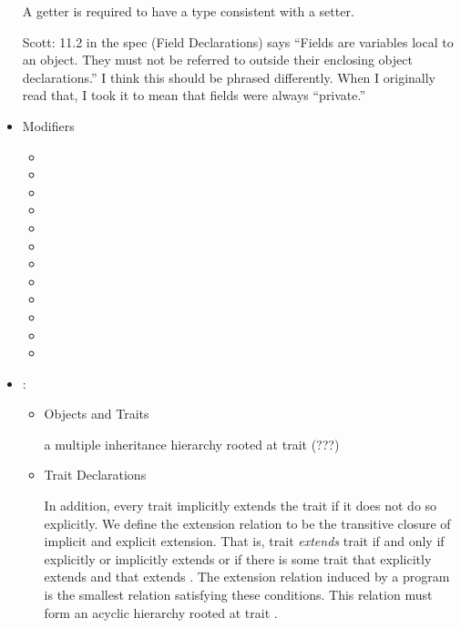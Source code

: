 \begin{itemize}
 A getter is required to have a type consistent with a setter.

Scott: 11.2 in the spec (Field Declarations) says ``Fields are variables local to an object. They must not be referred to outside their enclosing object declarations.'' I think this should be phrased differently. When I originally read that, I took it to mean that fields were always ``private.''

\item Modifiers
 \begin{itemize}
 \item {}%
 \item {}%
 \item {}%
 \item {}%
 \item {}%
 \item {}
 \item {}%
 \item {}%
 \item {}%
 \item {}
 \item {}
 \item {}%
 \end{itemize}

\item {}:
 \begin{itemize}
\item %
 Objects and Traits

a multiple inheritance hierarchy rooted at trait  (???)

\item {} Trait Declarations

In addition, every trait implicitly extends the trait 
if it does not do so explicitly.
We define the extension relation to be the transitive closure
of implicit and explicit extension.
That is, trait  \emph{extends} trait 
if and only if  explicitly or implicitly
extends  or if there is some trait 
that  explicitly extends and that extends .
The extension relation induced by a program is the smallest
relation satisfying these conditions.
This relation must form an acyclic hierarchy
rooted at trait .


\end{itemize}
\end{itemize}
